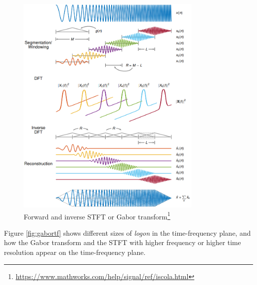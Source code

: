 \documentclass[report.tex]{subfiles}
\begin{document}
\begin{figure}[ht]
	\centering
        \begin{minipage}{1.\textwidth}
		\renewcommand\footnoterule{} %
		\renewcommand{\thempfootnote}{\fnsymbol{mpfootnote}}
		\centering
		\includegraphics[width=0.8\textwidth]{./images-tftheory/stft_diagram.png}
		\caption[Forward and inverse STFT or Gabor transform]{Forward and inverse STFT or Gabor transform\footnote[1]{\url{https://www.mathworks.com/help/signal/ref/iscola.html}}}
		\label{fig:stftdiagram}
	\end{minipage}
\end{figure}

Figure \ref{fig:gabortf} shows different sizes of \textit{logon} in the time-frequency plane, and how the Gabor transform and the STFT with higher frequency or higher time resolution appear on the time-frequency plane.
\end{document}
